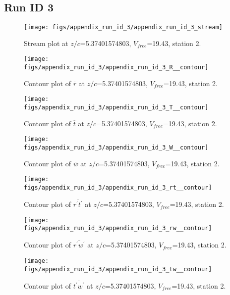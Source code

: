 \subsection{Run ID 3}
\begin{figure}[H]
\centering
\texttt{[image: figs/appendix\_run\_id\_3/appendix\_run\_id\_3\_stream]}
\caption{Stream plot at $z/c$=5.37401574803, $V_{free}$=19.43, station 2.}
\label{fig:appendix_run_id_3_stream}
\end{figure}


\begin{figure}[H]
\centering
\texttt{[image: figs/appendix\_run\_id\_3/appendix\_run\_id\_3\_R\_\_contour]}
\caption{Contour plot of $\overline{r}$ at $z/c$=5.37401574803, $V_{free}$=19.43, station 2.}
\label{fig:appendix_run_id_3_R__contour}
\end{figure}


\begin{figure}[H]
\centering
\texttt{[image: figs/appendix\_run\_id\_3/appendix\_run\_id\_3\_T\_\_contour]}
\caption{Contour plot of $\overline{t}$ at $z/c$=5.37401574803, $V_{free}$=19.43, station 2.}
\label{fig:appendix_run_id_3_T__contour}
\end{figure}


\begin{figure}[H]
\centering
\texttt{[image: figs/appendix\_run\_id\_3/appendix\_run\_id\_3\_W\_\_contour]}
\caption{Contour plot of $\overline{w}$ at $z/c$=5.37401574803, $V_{free}$=19.43, station 2.}
\label{fig:appendix_run_id_3_W__contour}
\end{figure}


\begin{figure}[H]
\centering
\texttt{[image: figs/appendix\_run\_id\_3/appendix\_run\_id\_3\_rt\_\_contour]}
\caption{Contour plot of $\overline{r^\prime t^\prime}$ at $z/c$=5.37401574803, $V_{free}$=19.43, station 2.}
\label{fig:appendix_run_id_3_rt__contour}
\end{figure}


\begin{figure}[H]
\centering
\texttt{[image: figs/appendix\_run\_id\_3/appendix\_run\_id\_3\_rw\_\_contour]}
\caption{Contour plot of $\overline{r^\prime w^\prime}$ at $z/c$=5.37401574803, $V_{free}$=19.43, station 2.}
\label{fig:appendix_run_id_3_rw__contour}
\end{figure}


\begin{figure}[H]
\centering
\texttt{[image: figs/appendix\_run\_id\_3/appendix\_run\_id\_3\_tw\_\_contour]}
\caption{Contour plot of $\overline{t^\prime w^\prime}$ at $z/c$=5.37401574803, $V_{free}$=19.43, station 2.}
\label{fig:appendix_run_id_3_tw__contour}
\end{figure}


